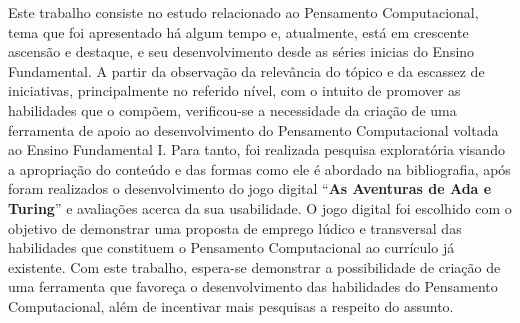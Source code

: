 Este trabalho consiste no estudo relacionado ao Pensamento Computacional, tema que foi apresentado há algum tempo e, atualmente, está em crescente ascensão e destaque, e seu desenvolvimento desde as séries inicias do Ensino Fundamental. A partir da observação da relevância do tópico e da escassez de iniciativas, principalmente no referido nível, com o intuito de promover as habilidades que o compõem, verificou-se a necessidade da criação de uma ferramenta de apoio ao desenvolvimento do Pensamento Computacional voltada ao Ensino Fundamental I. Para tanto, foi realizada pesquisa exploratória visando a apropriação do conteúdo e das formas como ele é abordado na bibliografia, após foram realizados o desenvolvimento do jogo digital “\textbf{As Aventuras de Ada e Turing}” e avaliações acerca da sua usabilidade. O jogo digital foi escolhido com o objetivo de demonstrar uma proposta de emprego lúdico e transversal das habilidades que constituem o Pensamento Computacional ao currículo já existente. Com este trabalho, espera-se demonstrar a possibilidade de criação de uma ferramenta que favoreça o desenvolvimento das habilidades do Pensamento Computacional, além de incentivar mais pesquisas a respeito do assunto.